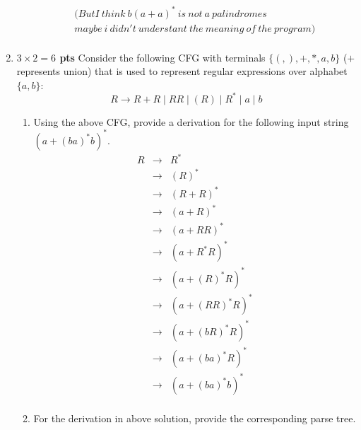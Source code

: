 \documentclass[10pt]{article}
\newcommand {\pts}[1]{{\bf #1 pts}}
\begin{document}
\begin{enumerate}
\begin{enumerate}
\[\begin{array}{cll}
                  (But I \ think \ b(a + a)^* \ is \  not \ a \ palindromes \ \\ maybe \  i \  didn't \  understant \  the \  meaning \  of \  the \  program )\\   
            \end{array}\]
  \end{enumerate}
  \item \pts{$3\times 2= 6$} Consider the following CFG with terminals $\{(,),+,*,a,b\}$ ($+$ represents union) that is used to represent
regular expressions over alphabet $\{a, b\}$:
\[R\rightarrow R+R \mid RR\mid (R)\mid R^\ast \mid a\mid b\]
\begin{enumerate}
  \item Using the above CFG, provide a derivation for the following input string $(a+(ba)^\ast b)^\ast$.
            \[\begin{array}{cll}
                  R & \rightarrow & R^\ast \\
                    & \rightarrow & (R)^\ast \\
                    & \rightarrow & (R+R)^\ast \\
                    & \rightarrow & (a+R)^\ast \\
                    & \rightarrow & (a+RR)^\ast \\
                    & \rightarrow & (a+R^\ast R)^\ast \\
                    & \rightarrow & (a+(R)^\ast R)^\ast \\
                    & \rightarrow & (a+(RR)^\ast R)^\ast \\
                    & \rightarrow & (a+(bR)^\ast R)^\ast \\
                    & \rightarrow & (a+(ba)^\ast R)^\ast \\
                    & \rightarrow & (a+(ba)^\ast b)^\ast \\
            \end{array}\]  
  \item For the derivation in above solution, provide the corresponding parse tree.
            \\
            \\
            \\
            \begin{tikzpicture} [level distance=20mm,
                                every node/.style={fill=red!60,circle,inner sep=1pt},
                      level 1/.style={sibling distance=60mm,nodes={fill=red!45}}, level 2/.style={sibling distance=40mm,nodes={fill=red!30}}, level 3/.style={sibling distance=20mm,nodes={fill=red!25}}]

\end{tikzpicture}
\end{enumerate}
\end{enumerate}
\end{document}

